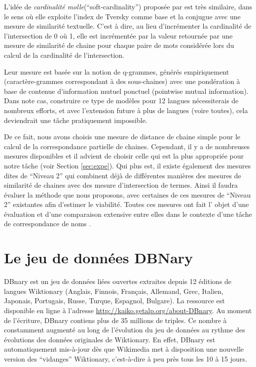 \documentclass[10pt,a4paper,twoside]{article}
\begin{document}
 L'idée de \emph{cardinalité molle}(``soft-cardinality'') proposée par \cite{Jimenez2010,Jimenez2012} est très similaire, dans le sens où elle exploite l'index de Tversky comme base et la conjugue avec une mesure de similarité textuelle. C'est à dire, au lieu d'incrémenter la cardinalité de l'intersection de 0 où 1, elle est incrémentée par la valeur retournée par une mesure de similarité de chaine pour chaque paire de mots considérée lors du calcul de la cardinalité de l'intersection. 
 
  Leur mesure est basée sur la notion de q-grammes, générés empiriquement (caractère-grammes correspondant à des sous-chaines) avec une pondération à base de contenue d'information mutuel ponctuel (pointwise mutual information). Dans note cas, construire ce type de modèles pour 12 langues nécessiterais de nombreux efforts, et avec l'extension future à plus de langues (voire toutes), cela deviendrait une tâche pratiquement impossible. 
 
 De ce fait, nous avons choisis une mesure de distance de chaine simple pour le calcul de la correspondance partielle de chaines. Cependant, il y a de nombreuses mesures disponibles et il advient de choisir celle qui est la plus appropriée pour notre tâche (voir Section \ref{sec:expe}). Qui plus est, il existe également des mesures dites de ``Niveau 2'' qui combinent déjà de différentes manières des mesures de similarité de chaines avec des mesure d'intersection de termes. Ainsi il faudra évaluer la méthode que nous proposons, avec certaines de ces mesures de ``Niveau 2'' existantes afin d'estimer le viabilité. Toutes ces mesures ont fait l' objet d'une évaluation et d'une comparaison extensive entre elles dans le contexte d'une tâche de correspondance de noms \cite{Cohen2003}.

\section{Le jeu de données DBNary}

DBnary est un jeu de données liées ouvertes extraites depuis 12 éditions de langues Wiktionary (Anglais, Finnois, Français, Allemand, Grec, Italien, Japonais, Portugais, Russe, Turque, Espagnol, Bulgare). La ressource est disponible en ligne à l'adresse \url{http://kaiko.getalp.org/about-DBnary}. Au moment de l'écriture, DBnary contiens  plus de  35 millions de triples. Ce nombre à constamment augmenté au long de l'évolution du jeu de données au rythme des évolutions des données originales de Wiktionary. En effet, DBnary est automatiquement mis-à-jour dès que Wikimedia met à disposition une nouvelle version des ``vidanges'' Wiktionary, c'est-à-dire à peu près tous les 10 à 15 jours.
\end{document}
